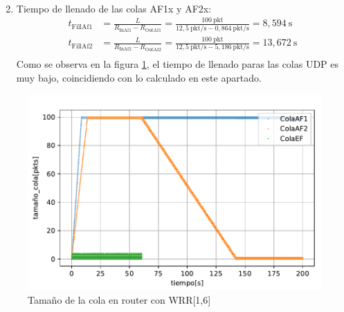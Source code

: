 \begin{enumerate}
\[\begin{aligned}
        \end{aligned}
    \]
    \item Tiempo de llenado de las colas AF1x y AF2x:
    \[
        \begin{aligned}
            t_{\text{FillAf1}} &= \frac{L}{R_{\text{InAf1}} - R_{\text{OutAf1}}} = \frac{100~\text{pkt}}{12,5~\text{pkt/s} - 0,864~\text{pkt/s}} = 8,594~\text{s} \\
            t_{\text{FillAf2}} &= \frac{L}{R_{\text{InAf2}} - R_{\text{OutAf2}}} = \frac{100~\text{pkt}}{12,5~\text{pkt/s} - 5,186~\text{pkt/s}} = 13,672~\text{s} \\
        \end{aligned}
    \]
    Como se observa en la figura \ref{fig:wrr16_tam}, el tiempo de llenado paras las colas UDP es muy 
    bajo, coincidiendo con lo calculado en este apartado.
\end{enumerate}
\begin{figure}[!ht]
    \centering
    \includegraphics{graficas/WRR/tamao_cola_wrr.pdf}
    \caption{Tamaño de la cola en router con WRR[1,6]}
    \label{fig:wrr16_tam}
\end{figure}

\vspace{0,3cm}

